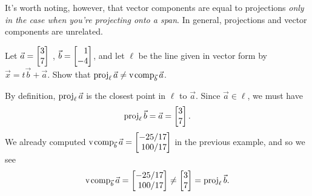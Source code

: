 It's worth noting, however, that vector components are equal to projections \emph{only in the case when you're
projecting onto a span}. In general, projections and vector components are unrelated. 

\begin{example}
	Let $\vec a=\mat{3\\7}$ , $\vec b=\mat{1\\-4}$, and let $\ell$ be the line given in vector form by
	$\vec x=t\vec b+\vec a$. Show that $\operatorname{proj}_\ell\vec a\neq \operatorname{v\hspace{1pt}comp}_{\vec b}\vec a$.

	By definition, $\operatorname{proj}_{\ell}\vec a$ is the closest point in $\ell$ to $\vec a$. Since $\vec a\in\ell$, we must
	have 	
	\[
	    \Proj_{\ell}\vec b = \vec a = \mat{3\\7}.
	\]
	We already computed $\Vcomp_{\vec b}\vec a=\mat{-25/17\\100/17}$ in the previous example, and so we see
	\[
		\Vcomp_{\vec b}\vec a=\mat{-25/17\\100/17}\neq \mat{3\\7}=\Proj_{\ell}\vec b.
	\]
\end{example}
